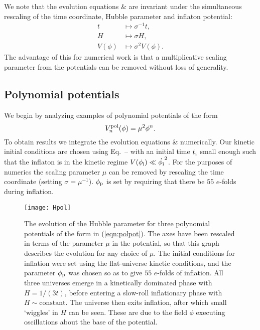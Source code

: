 We note that the evolution equations  \&
 are invariant under  the simultaneous
rescaling of the time coordinate, Hubble parameter and inflaton
potential:
%
\begin{align}
  t 
  &\longmapsto 
  \sigma^{-1}t,
  \\
  H 
  &\longmapsto 
  \sigma H,
  \\
  V(\phi) 
  &\longmapsto
  \sigma^2 V(\phi).
\end{align}
%
The advantage of this for numerical work is that a multiplicative
scaling parameter from the potentials can be removed without loss of
generality.


\subsection{Polynomial potentials}
\label{sec:section_polynomial_potentials}
We begin by analyzing examples of polynomial potentials of the form
%
\begin{equation}
  V^\mathrm{pol}_n(\phi) = \mu^2\phi^n.
  \label{eqn:polpot}
\end{equation}
%
To obtain results we integrate the evolution equations
 \&  numerically.
Our kinetic initial conditions are chosen using Eq.\ 
-- with an initial time $t_{\mathrm{i}}$ small
enough such that the inflaton is in the kinetic regime
$V(\phi_{\mathrm{i}})\ll\dot{\phi_{\mathrm{i}}}^2$. For the purposes of numerics the scaling
parameter $\mu$ can be removed by rescaling the time coordinate
(setting $\sigma=\mu^{-1}$). $\phi_{\mathrm{p}}$ is set by requiring that there
be $55$ $e$-folds during inflation.

%
\begin{figure}
  \texttt{[image: Hpol]}
  \caption{The evolution of the Hubble parameter for three polynomial
    potentials of the form in (\ref{eqn:polpot}). The axes have been
    rescaled in terms of the parameter $\mu$ in the potential, so that
    this graph describes the evolution for any choice of $\mu$. The
    initial conditions for inflation were set using the flat-universe
    kinetic conditions, and the parameter $\phi_{\mathrm{p}}$ was chosen so as to
    give $55$ $e$-folds of inflation. All three universes emerge in a
    kinetically dominated phase with $H=1/(3t)$, before entering a
    slow-roll inflationary phase with $H\sim\mathrm{constant}$. The
    universe then exits inflation, after which small `wiggles' in $H$
    can be seen. These are due to the field $\phi$ executing
    oscillations about the base of the potential.}
  \label{fig:figure_Hpol}
\end{figure}
%


